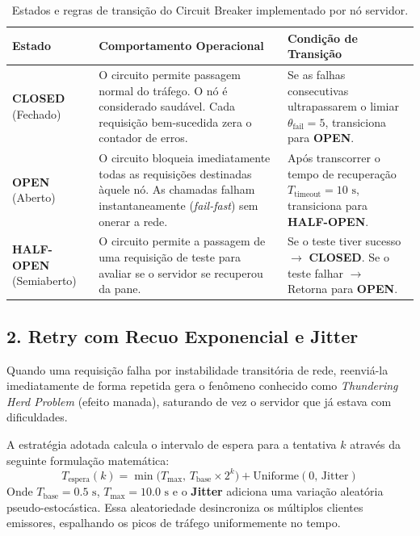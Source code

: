 \documentclass[11pt,a4paper]{article}
\begin{document}
\begin{table}[H]
\centering
\small
\begin{tabularx}{\linewidth}{p{2.2cm} X p{4.6cm}}
\toprule
\textbf{Estado} & \textbf{Comportamento Operacional} & \textbf{Condição de Transição} \\
\midrule
\textbf{CLOSED} \newline (Fechado) & 
O circuito permite passagem normal do tráfego. O nó é considerado saudável. Cada requisição bem-sucedida zera o contador de erros. & 
Se as falhas consecutivas ultrapassarem o limiar $\theta_{\text{fail}} = 5$, transiciona para \textbf{OPEN}. \\
\addlinespace
\textbf{OPEN} \newline (Aberto) & 
O circuito bloqueia imediatamente todas as requisições destinadas àquele nó. As chamadas falham instantaneamente (\textit{fail-fast}) sem onerar a rede. & 
Após transcorrer o tempo de recuperação $T_{\text{timeout}} = 10\text{ s}$, transiciona para \textbf{HALF-OPEN}. \\
\addlinespace
\textbf{HALF-OPEN} \newline (Semiaberto) & 
O circuito permite a passagem de uma requisição de teste para avaliar se o servidor se recuperou da pane. & 
Se o teste tiver sucesso $\to$ \textbf{CLOSED}. \newline
Se o teste falhar $\to$ Retorna para \textbf{OPEN}. \\
\bottomrule
\end{tabularx}
\caption{Estados e regras de transição do Circuit Breaker implementado por nó servidor.}
\end{table}

\subsection{2. Retry com Recuo Exponencial e Jitter}
Quando uma requisição falha por instabilidade transitória de rede, reenviá-la imediatamente de forma repetida gera o fenômeno conhecido como \textit{Thundering Herd Problem} (efeito manada), saturando de vez o servidor que já estava com dificuldades.

A estratégia adotada calcula o intervalo de espera para a tentativa $k$ através da seguinte formulação matemática:
\begin{equation}
T_{\text{espera}}(k) = \min\Big(T_{\text{max}},\, T_{\text{base}} \times 2^{k}\Big) + \text{Uniforme}(0,\, \text{Jitter})
\end{equation}
Onde $T_{\text{base}} = 0.5\text{ s}$, $T_{\text{max}} = 10.0\text{ s}$ e o \textbf{Jitter} adiciona uma variação aleatória pseudo-estocástica. Essa aleatoriedade desincroniza os múltiplos clientes emissores, espalhando os picos de tráfego uniformemente no tempo.
\end{document}
